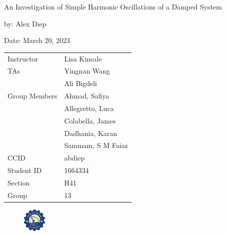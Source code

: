 \documentclass[letterpaper,12pt]{article} %
\begin{document}
\begin{titlepage}
    \centering
    \vspace*{2cm} %
    
    \Huge {An Investigation of Simple Harmonic Oscillations of a Damped System} \\
    \vspace{1cm} %
    
    \Large by: Alex Diep \\
    \vspace{1cm} %

    \Large Date: March 20, 2023 \\ %
    \vspace{2cm} %

    \begin{table}[h]
        \centering
        \begin{tabular}{ll}
            Instructor & Lisa Kinsale \\
            TAs & Yingnan Wang \\
            & Ali Bigdeli \vspace{0.5cm} \\
            Group Members & Ahmad, Safiya \\
            & Allegretto, Luca \\
            & Colabella, James \\
            & Dadhania, Karan \\
            & Sammam, S M Faiaz \vspace{0.5cm} \\
            CCID & abdiep \\
            Student ID & 1664334 \\
            Section & H41 \\
            Group & 13 \\
        \end{tabular}
    \end{table}
    \begin{figure}[h]
        \centering
        \includegraphics[width=0.1\textwidth]{uofa_engineering_logo.png}
    \end{figure}
    \vfill %
\end{titlepage}
\renewcommand\arraystretch{1.5}
\end{document}
